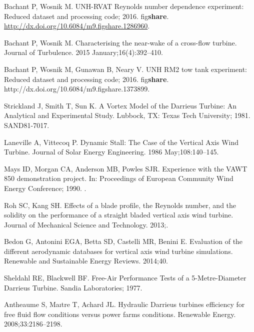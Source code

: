 \documentclass[10pt,letterpaper]{article}
\begin{document}
\begin{thebibliography}{10}
    Bachant P, Wosnik M. {UNH-RVAT} {R}eynolds number dependence experiment:
    Reduced dataset and processing code; 2016.
    \newblock fig\textbf{share}.
    \url{http://dx.doi.org/10.6084/m9.figshare.1286960}.

    Bachant P, Wosnik M.
    \newblock Characterising the near-wake of a cross-flow turbine.
    \newblock Journal of Turbulence. 2015 January;16(4):392--410.

    Bachant P, Wosnik M, Gunawan B, Neary V. {UNH} {RM2} tow tank experiment:
    Reduced dataset and processing code; 2016.
    \newblock fig\textbf{share}. http://dx.doi.org/10.6084/m9.figshare.1373899.

    Strickland J, Smith T, Sun K.
    \newblock A Vortex Model of the Darrieus Turbine: An Analytical and
    Experimental Study.
    \newblock Lubbock, {TX}: Texas Tech University; 1981. SAND81-7017.

    Laneville A, Vittecoq P.
    \newblock Dynamic Stall: The Case of the Vertical Axis Wind Turbine.
    \newblock Journal of Solar Energy Engineering. 1986 May;108:140--145.

    Mays ID, Morgan CA, Anderson MB, Powles SJR.
    \newblock Experience with the {VAWT} 850 demonstration project.
    \newblock In: Proceedings of European Community Wind Energy Conference; 1990. .

    Roh SC, Kang SH.
    \newblock Effects of a blade profile, the {R}eynolds number, and the solidity
    on the performance of a straight bladed vertical axis wind turbine.
    \newblock Journal of Mechanical Science and Technology. 2013;.

    Bedon G, Antonini EGA, Betta SD, Castelli MR, Benini E.
    \newblock Evaluation of the different aerodynamic databases for vertical axis
    wind turbine simulations.
    \newblock Renewable and Sustainable Energy Reviews. 2014;40.

    Sheldahl RE, Blackwell BF.
    \newblock Free-Air Performance Tests of a 5-Metre-Diameter Darrieus Turbine.
    \newblock Sandia Laboratories; 1977.

    Antheaume S, Maıtre T, Achard JL.
    \newblock Hydraulic Darrieus turbines efficiency for free fluid flow conditions
    versus power farms conditions.
    \newblock Renewable Energy. 2008;33:2186--2198.


\end{thebibliography}
\end{document}
